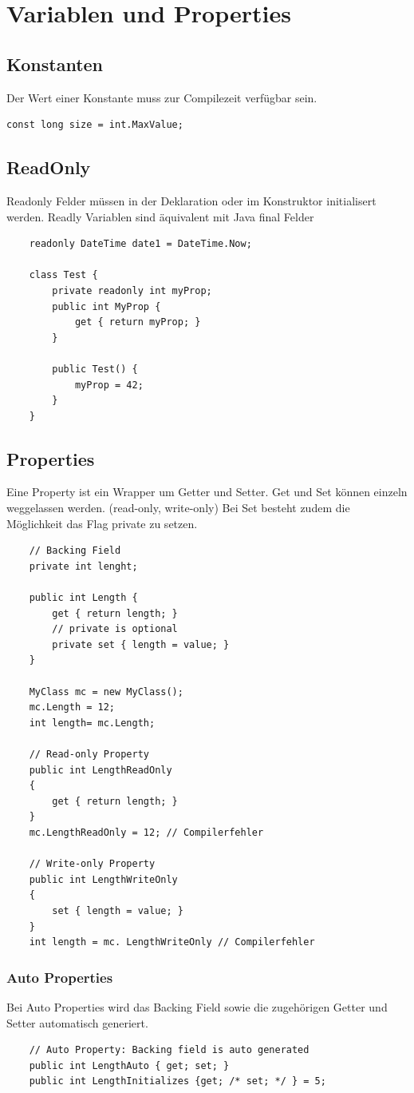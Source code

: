 \documentclass[
a4paper,
oneside,
10pt,
fleqn,
headsepline,
toc=listofnumbered, 
bibliography=totocnumbered]{scrartcl}
\let\stdsection\section
\renewcommand\section{\clearpage\stdsection}
\begin{document}
\section{Variablen und Properties}
\subsection{Konstanten}
Der Wert einer Konstante muss zur Compilezeit verfügbar sein.
\begin{lstlisting}
const long size = int.MaxValue;
\end{lstlisting}

\subsection{ReadOnly}
Readonly Felder müssen in der Deklaration oder im Konstruktor initialisert werden. Readly Variablen sind äquivalent mit Java final Felder
\begin{lstlisting}
	readonly DateTime date1 = DateTime.Now;
	
	class Test {
		private readonly int myProp;
		public int MyProp {
			get { return myProp; }
		}
		
		public Test() {
			myProp = 42;
		}
	}
\end{lstlisting}

\subsection{Properties}
Eine Property ist ein Wrapper um Getter und Setter. Get und Set können einzeln weggelassen werden. (read-only, write-only) Bei Set besteht zudem die Möglichkeit das Flag private zu setzen. 
\begin{lstlisting}
	// Backing Field
	private int lenght;
	
	public int Length {
		get { return length; }
		// private is optional
		private set { length = value; } 
	}
	
	MyClass mc = new MyClass();
	mc.Length = 12;
	int length= mc.Length;
	
	// Read-only Property
    public int LengthReadOnly
    {
        get { return length; }
    }
    mc.LengthReadOnly = 12; // Compilerfehler
    
    // Write-only Property
    public int LengthWriteOnly
    {
        set { length = value; }
    }
    int length = mc. LengthWriteOnly // Compilerfehler
\end{lstlisting}

\subsubsection{Auto Properties}
Bei Auto Properties wird das Backing Field sowie die zugehörigen Getter und Setter automatisch generiert.
\begin{lstlisting}
	// Auto Property: Backing field is auto generated
	public int LengthAuto { get; set; }
	public int LengthInitializes {get; /* set; */ } = 5;
\end{lstlisting}
\end{document}

